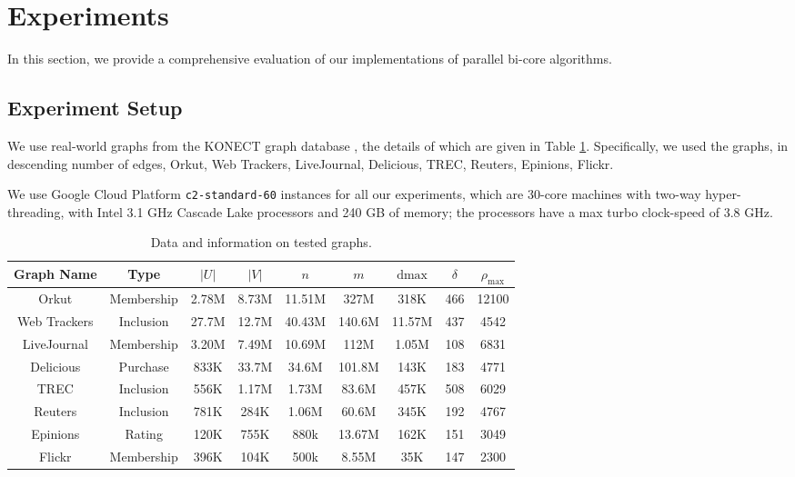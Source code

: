 \section{Experiments}


In this section, we provide a comprehensive evaluation of our implementations of parallel bi-core algorithms.

\subsection{Experiment Setup}

We use real-world graphs from the KONECT graph database \cite{Kunegis13}, the details of which are given in Table \ref{tab:graphs}. Specifically, we used the graphs, in descending number of edges, Orkut, Web Trackers, LiveJournal, Delicious, TREC, Reuters, Epinions, Flickr.

We use Google Cloud Platform \texttt{c2-standard-60} instances for all our experiments, which are 30-core machines with two-way hyper-threading, with Intel 3.1 GHz Cascade Lake processors and 240 GB of memory; the processors have a max turbo clock-speed of 3.8 GHz.

\begin{table}[t]
 \begin{tabular}{|| c c c c c c c c c ||} 
 \hline
 Graph Name & Type & $|U|$ & $|V|$ & $n$ & $m$ & $\text{dmax}$ & $\delta$ & $\rho_{\text{max}}$ \\ [0.5ex] 
 \hline
 Orkut & Membership & 2.78M & 8.73M & 11.51M & 327M & 318K & 466 & 12100 \\
 \hline
 Web Trackers & Inclusion & 27.7M & 12.7M & 40.43M & 140.6M & 11.57M & 437 & 4542 \\
 \hline  
 LiveJournal & Membership & 3.20M & 7.49M & 10.69M & 112M & 1.05M & 108 & 6831 \\
 \hline
 Delicious & Purchase & 833K & 33.7M & 34.6M & 101.8M & 143K & 183 & 4771 \\
 \hline
 TREC & Inclusion & 556K & 1.17M & 1.73M & 83.6M & 457K & 508 & 6029 \\
 \hline
 Reuters & Inclusion & 781K & 284K & 1.06M & 60.6M & 345K & 192 & 4767 \\
 \hline
 Epinions & Rating & 120K & 755K & 880k & 13.67M & 162K & 151 & 3049 \\
 \hline
 Flickr & Membership & 396K & 104K & 500k & 8.55M & 35K & 147 & 2300 \\
 \hline
\end{tabular}
\caption{\label{tab:graphs}Data and information on tested graphs.}
\end{table}


